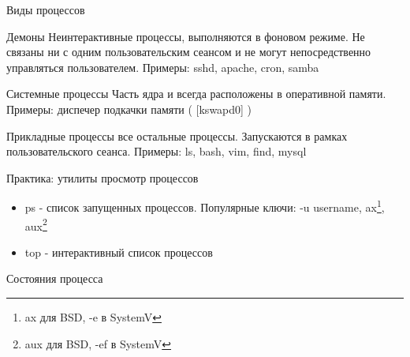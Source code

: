 \begin{frame}{Виды процессов}
  \begin{block}{Демоны}
    Неинтерактивные процессы, выполняются в фоновом режиме. Не связаны ни с одним пользовательским сеансом и не могут непосредственно управляться пользователем. \newline
    Примеры: \alert{sshd}, \alert{apache}, \alert{cron}, \alert{samba}
  \end{block} \pause

  \begin{block}{Системные процессы}
    Часть ядра и всегда расположены в оперативной памяти. \newline
    Примеры: диспечер подкачки памяти ( \alert{[kswapd0]} )
  \end{block} \pause

  \begin{block}{Прикладные процессы}
    все остальные процессы. Запускаются в рамках пользовательского сеанса. \newline
    Примеры: \alert{ls}, \alert{bash}, \alert{vim}, \alert{find}, \alert{mysql}

  \end{block}

\end{frame}

\begin{frame}[fragile]{Практика: утилиты просмотр процессов}
    
  \begin{itemize}
      \item \alert{ps} - список запущенных процессов.\newline
	Популярные ключи: \alert{-u username}, 
	\alert{ax}\footnote{ \alert{ax} для BSD, \alert{-e} в SystemV}, 
	\alert{aux}\footnote{ \alert{aux} для BSD, \alert{-ef} в SystemV}

      \item \alert{top} - интерактивный список процессов

    \end{itemize}

\end{frame}

\begin{frame}{Состояния процесса}
\end{frame}

